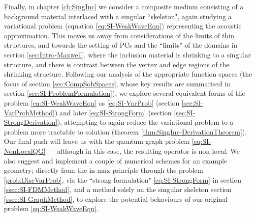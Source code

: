 Finally, in chapter \ref{ch:SingInc} we consider a composite medium consisting of a background material interlaced with a singular ``skeleton", again studying a variational problem (equation \eqref{eq:SI-WeakWaveEqn}) representing the acoustic approximation.
This moves us away from considerations of the limits of thin structures, and towards the setting of PCs and the ``limits" of the domains in section \ref{sec:Intro-Maxwell}, where the inclusion material is shrinking to a singular structure, and there is contrast between the vertex and edge regions of the shrinking structure.
Following our analysis of the appropriate function spaces (the focus of section \ref{sec:CompSobSpaces}, whose key results are summarised in section \ref{sec:SI-ProblemFormulation}), we explore several equivalent forms of the problem \eqref{eq:SI-WeakWaveEqn} as \eqref{eq:SI-VarProb} (section \ref{sec:SI-VarProbMethod}) and later \eqref{eq:SI-StrongForm} (section \ref{sec:SI-StrongDerivation}), attempting to again reduce the variational problem to a problem more tractable to solution (theorem \ref{thm:SingInc-DerivationTheorem}).
Our final push will leave us with the quantum graph problem \eqref{eq:SI-NonLocalQG} --- although in this case, the resulting operator is non-local.
We also suggest and implement a couple of numerical schemes for an example geometry; directly from the in-max principle through the problem \ref{prob:DiscVarProb}, via the ``strong formulation" \eqref{eq:SI-StrongForm} in section \ref{ssec:SI-FDMMethod}, and a method solely on the singular skeleton section \ref{ssec:SI-GraphMethod}, to explore the potential behaviours of our original problem \eqref{eq:SI-WeakWaveEqn}.